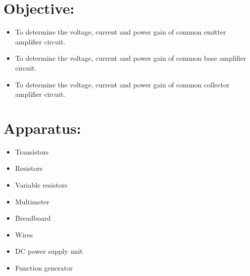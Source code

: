 \documentclass[a4paper, 12pt]{extarticle}
\begin{document}
\section{Objective:}
    \begin{itemize}
        \item To determine the voltage, current and power gain of common emitter amplifier circuit.
        \item To determine the voltage, current and power gain of common base amplifier circuit.
        \item To determine the voltage, current and power gain of common collector amplifier circuit.
    \end{itemize}
\section{Apparatus:}
\begin{minipage}[t]{0.45\linewidth}
      \begin{itemize}
        \item Transistors
        \item Resistors
        \item Variable resistors
        \item Multimeter
      \end{itemize}
    \end{minipage}
    \hfill
    \begin{minipage}[t]{0.45\linewidth}
      \begin{itemize}
        \item Breadboard
        \item Wires
        \item DC power supply unit
        \item Function generator
      \end{itemize}
    \end{minipage}
\end{document}

